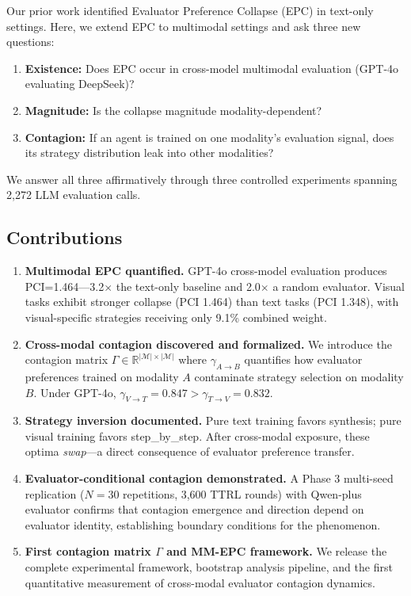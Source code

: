 \documentclass[11pt,a4paper]{article}
\begin{document}
Our prior work identified Evaluator Preference Collapse (EPC) in text-only settings. Here, we extend EPC to multimodal settings and ask three new questions:

\begin{enumerate}[leftmargin=*]
    \item \textbf{Existence:} Does EPC occur in cross-model multimodal evaluation (GPT-4o evaluating DeepSeek)?
    \item \textbf{Magnitude:} Is the collapse magnitude modality-dependent?
    \item \textbf{Contagion:} If an agent is trained on one modality's evaluation signal, does its strategy distribution leak into other modalities?
\end{enumerate}

We answer all three affirmatively through three controlled experiments spanning 2,272 LLM evaluation calls.

\subsection{Contributions}
\begin{enumerate}[leftmargin=*]
    \item \textbf{Multimodal EPC quantified.} GPT-4o cross-model evaluation produces PCI=1.464---3.2$\times$ the text-only baseline and 2.0$\times$ a random evaluator. Visual tasks exhibit stronger collapse (PCI 1.464) than text tasks (PCI 1.348), with visual-specific strategies receiving only 9.1\% combined weight.
    \item \textbf{Cross-modal contagion discovered and formalized.} We introduce the contagion matrix $\Gamma \in \mathbb{R}^{|\mathcal{M}|\times|\mathcal{M}|}$ where $\gamma_{A\to B}$ quantifies how evaluator preferences trained on modality $A$ contaminate strategy selection on modality $B$. Under GPT-4o, $\gamma_{V\to T}=0.847 > \gamma_{T\to V}=0.832$.
    \item \textbf{Strategy inversion documented.} Pure text training favors synthesis; pure visual training favors step\_by\_step. After cross-modal exposure, these optima \textit{swap}---a direct consequence of evaluator preference transfer.
    \item \textbf{Evaluator-conditional contagion demonstrated.} A Phase 3 multi-seed replication ($N=30$ repetitions, 3,600 TTRL rounds) with Qwen-plus evaluator confirms that contagion emergence and direction depend on evaluator identity, establishing boundary conditions for the phenomenon.
    \item \textbf{First contagion matrix $\Gamma$ and MM-EPC framework.} We release the complete experimental framework, bootstrap analysis pipeline, and the first quantitative measurement of cross-modal evaluator contagion dynamics.
\end{enumerate}
\end{document}
